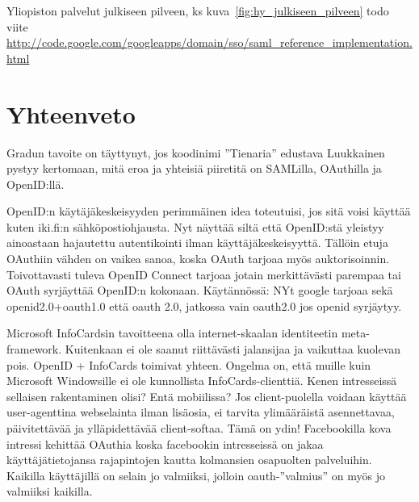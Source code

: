 \documentclass[finnish,gradu]{tktltiki}
\begin{document}
    Yliopiston palvelut julkiseen pilveen, ks kuva~\ref{fig:hy_julkiseen_pilveen}
    todo viite \url{http://code.google.com/googleapps/domain/sso/saml_reference_implementation.html}




\section{Yhteenveto} %
\label{sec:yhteenveto}

    Gradun tavoite on täyttynyt, jos koodinimi ''Tienaria'' edustava Luukkainen pystyy kertomaan, mitä eroa ja yhteisiä piiretitä on SAMLilla, OAuthilla ja OpenID:llä.

    OpenID:n käytäjäkeskeisyyden perimmäinen idea toteutuisi, jos sitä voisi käyttää kuten iki.fi:n sähköpostiohjausta. Nyt näyttää siltä että OpenID:stä yleistyy ainoastaan hajautettu autentikointi ilman käyttäjäkeskeisyyttä. Tällöin etuja OAuthiin vähden on vaikea sanoa, koska OAuth tarjoaa myös auktorisoinnin. Toivottavasti tuleva OpenID Connect tarjoaa jotain merkittävästi parempaa tai OAuth syrjäyttää OpenID:n kokonaan. Käytännössä: NYt google tarjoaa sekä openid2.0+oauth1.0 että oauth 2.0, jatkossa vain oauth2.0 jos openid syrjäytyy.

 Microsoft InfoCardsin tavoitteena olla internet-skaalan identiteetin meta-framework. Kuitenkaan ei ole saanut riittävästi jalansijaa ja vaikuttaa kuolevan pois. OpenID + InfoCards toimivat yhteen. Ongelma on, että muille kuin Microsoft Windowsille ei ole kunnollista InfoCards-clienttiä. Kenen intresseissä sellaisen rakentaminen olisi? Entä mobiilissa? Jos client-puolella voidaan käyttää user-agenttina webselainta ilman lisäosia, ei tarvita ylimääräistä asennettavaa, päivitettävää ja ylläpidettävää client-softaa. Tämä on ydin! Facebookilla kova intressi kehittää OAuthia koska facebookin intresseissä on jakaa käyttäjätietojansa rajapintojen kautta kolmansien osapuolten palveluihin. Kaikilla käyttäjillä on selain jo valmiiksi, jolloin oauth-''valmius'' on myös jo valmiiksi kaikilla.






\lastpage
\end{document}
